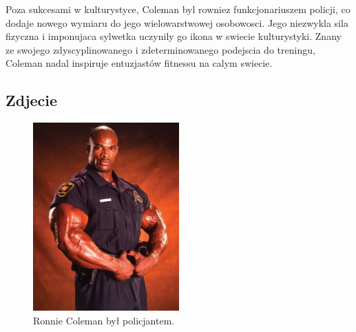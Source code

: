 Poza sukcesami w kulturystyce, Coleman byl rowniez funkcjonariuszem policji, co dodaje nowego wymiaru do jego wielowarstwowej osobowosci. Jego niezwykla sila fizyczna i imponujaca sylwetka uczynily go ikona w swiecie kulturystyki. Znany ze swojego zdyscyplinowanego i zdeterminowanego podejscia do treningu, Coleman nadal inspiruje entuzjastów fitnessu na calym swiecie.


\subsection{Zdjecie}

\begin{figure}[htbp]
    \centering
    \includegraphics[width=0.5\textwidth]{pictures/policjant.jpg}
    \caption{Ronnie Coleman był policjantem.}
    \label{fig:zdjecie}
\end{figure}
